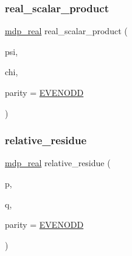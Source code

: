 \subsubsection{\texorpdfstring{real\+\_\+scalar\+\_\+product}{real\_scalar\_product}}
{\footnotesize\ttfamily \hyperlink{mdp__global__vars_8h_a69d96b74c791e0bbdb888b3913a69450}{mdp\+\_\+real} real\+\_\+scalar\+\_\+product (\begin{DoxyParamCaption}\item[{\hyperlink{classmdp__complex__field}{mdp\+\_\+complex\+\_\+field} \&}]{psi,  }\item[{\hyperlink{classmdp__complex__field}{mdp\+\_\+complex\+\_\+field} \&}]{chi,  }\item[{int}]{parity = {\ttfamily \hyperlink{mdp__global__vars_8h_a4c9de81f2de5a74b588107b6c0afb9ee}{E\+V\+E\+N\+O\+DD}} }\end{DoxyParamCaption})\hspace{0.3cm}{\ttfamily [friend]}}

\mbox{\label{classmdp__complex__field_a0936375b6edd3f01728d16ac38c76c32}} 
\subsubsection{\texorpdfstring{relative\+\_\+residue}{relative\_residue}}
{\footnotesize\ttfamily \hyperlink{mdp__global__vars_8h_a69d96b74c791e0bbdb888b3913a69450}{mdp\+\_\+real} relative\+\_\+residue (\begin{DoxyParamCaption}\item[{\hyperlink{classmdp__complex__field}{mdp\+\_\+complex\+\_\+field} \&}]{p,  }\item[{\hyperlink{classmdp__complex__field}{mdp\+\_\+complex\+\_\+field} \&}]{q,  }\item[{int}]{parity = {\ttfamily \hyperlink{mdp__global__vars_8h_a4c9de81f2de5a74b588107b6c0afb9ee}{E\+V\+E\+N\+O\+DD}} }\end{DoxyParamCaption})\hspace{0.3cm}{\ttfamily [friend]}}

\mbox{\label{classmdp__complex__field_a7a6ea38341405f2cc4e771b33b4ea38f}} 
